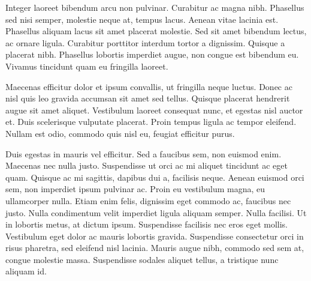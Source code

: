 Integer laoreet bibendum arcu non pulvinar. Curabitur ac magna nibh. Phasellus sed nisi semper, molestie neque at, tempus lacus. Aenean vitae lacinia est. Phasellus aliquam lacus sit amet placerat molestie. Sed sit amet bibendum lectus, ac ornare ligula. Curabitur porttitor interdum tortor a dignissim. Quisque a placerat nibh. Phasellus lobortis imperdiet augue, non congue est bibendum eu. Vivamus tincidunt quam eu fringilla laoreet.

Maecenas efficitur dolor et ipsum convallis, ut fringilla neque luctus. Donec ac nisl quis leo gravida accumsan sit amet sed tellus. Quisque placerat hendrerit augue sit amet aliquet. Vestibulum laoreet consequat nunc, et egestas nisl auctor et. Duis scelerisque vulputate placerat. Proin tempus ligula ac tempor eleifend. Nullam est odio, commodo quis nisl eu, feugiat efficitur purus.

Duis egestas in mauris vel efficitur. Sed a faucibus sem, non euismod enim. Maecenas nec nulla justo. Suspendisse ut orci ac mi aliquet tincidunt ac eget quam. Quisque ac mi sagittis, dapibus dui a, facilisis neque. Aenean euismod orci sem, non imperdiet ipsum pulvinar ac. Proin eu vestibulum magna, eu ullamcorper nulla. Etiam enim felis, dignissim eget commodo ac, faucibus nec justo. Nulla condimentum velit imperdiet ligula aliquam semper. Nulla facilisi. Ut in lobortis metus, at dictum ipsum. Suspendisse facilisis nec eros eget mollis. Vestibulum eget dolor ac mauris lobortis gravida. Suspendisse consectetur orci in risus pharetra, sed eleifend nisl lacinia. Mauris augue nibh, commodo sed sem at, congue molestie massa. Suspendisse sodales aliquet tellus, a tristique nunc aliquam id.

